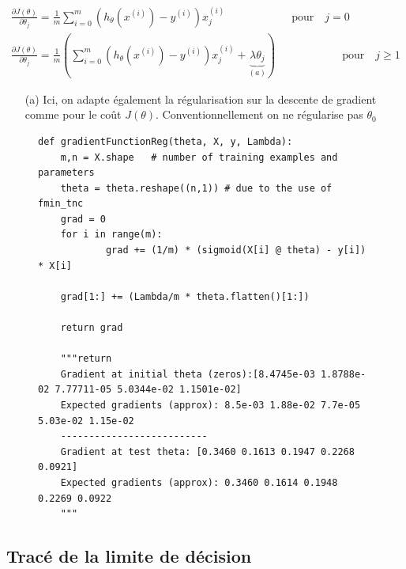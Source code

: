 \begin{align}\label{eq:descente-gradient-reg}
    \frac{\partial J(\theta)}{\partial \theta_j} = \frac{1}{m} \sum_{i=0}^{m} (h_\theta(x^{(i)}) - y^{(i)}) x_j^{(i)} \qquad \qquad \qquad \text{pour} \quad j=0 \\
    \frac{\partial J(\theta)}{\partial \theta_j} = \frac{1}{m} \left( \sum_{i=0}^{m} (h_\theta(x^{(i)}) - y^{(i)}) x_j^{(i)} + \underbrace{\lambda \theta_j}_{(a)} \right) \qquad \qquad \qquad \text{pour} \quad j\geq1 
\end{align}

\begin{itemize}
    \item [(a)] Ici, on adapte également la régularisation sur la descente de gradient comme pour le coût $J(\theta)$. Conventionnellement on ne régularise pas $\theta_0$
\end{itemize}

\begin{figure}[!h]
\begin{verbatim}
def gradientFunctionReg(theta, X, y, Lambda):
    m,n = X.shape   # number of training examples and parameters
    theta = theta.reshape((n,1)) # due to the use of fmin_tnc
    grad = 0
    for i in range(m):
            grad += (1/m) * (sigmoid(X[i] @ theta) - y[i]) * X[i]

    grad[1:] += (Lambda/m * theta.flatten()[1:])

    return grad

    """return 
    Gradient at initial theta (zeros):[8.4745e-03 1.8788e-02 7.77711-05 5.0344e-02 1.1501e-02]
    Expected gradients (approx): 8.5e-03 1.88e-02 7.7e-05 5.03e-02 1.15e-02
    -------------------------- 
    Gradient at test theta: [0.3460 0.1613 0.1947 0.2268 0.0921]
    Expected gradients (approx): 0.3460 0.1614 0.1948 0.2269 0.0922
    """
\end{verbatim}   
\end{figure}


\subsection{Tracé de la limite de décision}

